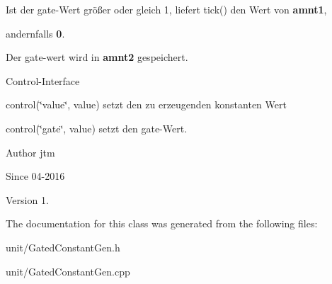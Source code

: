 \begin{DoxyItemize}
\item Ist der gate-\/\+Wert größer oder gleich 1, liefert tick() den Wert von {\bfseries amnt1},
\item andernfalls {\bfseries 0}.
\item Der gate-\/wert wird in {\bfseries amnt2} gespeichert.
\end{DoxyItemize}

Control-\/\+Interface


\begin{DoxyItemize}
\item control(\char`\"{}value\char`\"{}, value) setzt den zu erzeugenden konstanten Wert
\item control(\char`\"{}gate\char`\"{}, value) setzt den gate-\/\+Wert.
\end{DoxyItemize}

\begin{DoxyAuthor}{Author}
jtm 
\end{DoxyAuthor}
\begin{DoxySince}{Since}
04-\/2016 
\end{DoxySince}
\begin{DoxyVersion}{Version}
1. 
\end{DoxyVersion}


The documentation for this class was generated from the following files\+:\begin{DoxyCompactItemize}
\item 
unit/Gated\+Constant\+Gen.\+h\item 
unit/Gated\+Constant\+Gen.\+cpp\end{DoxyCompactItemize}
